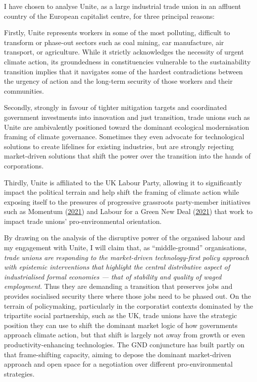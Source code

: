 \documentclass[a4paper, nobind]{templates/ociamthesis}
\begin{document}
I have chosen to analyse Unite, as a large industrial trade union in an affluent country of the European capitalist centre, for three principal reasons:

Firstly, Unite represents workers in some of the most polluting, difficult to transform or phase-out sectors such as coal mining, car manufacture, air transport, or agriculture. While it strictly acknowledges the necessity of urgent climate action, its groundedness in constituencies vulnerable to the sustainability transition implies that it navigates some of the hardest contradictions between the urgency of action and the long-term security of those workers and their communities.

Secondly, strongly in favour of tighter mitigation targets and coordinated government investments into innovation and just transition, trade unions such as Unite are ambivalently positioned toward the dominant ecological modernisation framing of climate governance. Sometimes they even advocate for technological solutions to create lifelines for existing industries, but are strongly rejecting market-driven solutions that shift the power over the transition into the hands of corporations.

Thirdly, Unite is affiliated to the UK Labour Party, allowing it to significantly impact the political terrain and help shift the framing of climate action while exposing itself to the pressures of progressive grassroots party-member initiatives such as Momentum (\protect\hyperlink{ref-momentum_us_2021}{2021}) and Labour for a Green New Deal (\protect\hyperlink{ref-labour_for_a_gnd_who_2021}{2021}) that work to impact trade unions' pro-environmental orientation.

By drawing on the analysis of the disruptive power of the organised labour and my engagement with Unite, I will claim that, as ``middle-ground'' organisations, \emph{trade unions are responding to the market-driven technology-first policy approach with epistemic interventions that highlight the central distributive aspect of industrialised formal economies --- that of stability and quality of waged employment}. Thus they are demanding a transition that preserves jobs and provides socialised security there where those jobs need to be phased out. On the terrain of policymaking, particularly in the corporatist contexts dominated by the tripartite social partnership, such as the UK, trade unions have the strategic position they can use to shift the dominant market logic of how governments approach climate action, but that shift is largely not away from growth or even productivity-enhancing technologies. The GND conjuncture has built partly on that frame-shifting capacity, aiming to depose the dominant market-driven approach and open space for a negotiation over different pro-environmental strategies.
\end{document}
